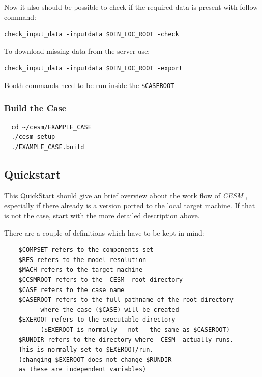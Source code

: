 \documentclass[]{article}
\begin{document}
Now it also should be possible to check if the required data is present
with follow command:

\begin{verbatim}
check_input_data -inputdata $DIN_LOC_ROOT -check
\end{verbatim}

To download missing data from the server use:

\begin{verbatim}
check_input_data -inputdata $DIN_LOC_ROOT -export
\end{verbatim}

Booth commands need to be run inside the \texttt{\$CASEROOT}

\subsubsection{Build the Case}\label{build-the-case}

\begin{verbatim}
  cd ~/cesm/EXAMPLE_CASE
  ./cesm_setup
  ./EXAMPLE_CASE.build
\end{verbatim}

\newpage

\subsection{Quickstart}\label{quickstart}

This QuickStart \cite{CESMDocs} should give an brief overview about the
work flow of \emph{CESM} , especially if there already is a version
ported to the local target machine. If that is not the case, start with
the more detailed description above.

There are a couple of definitions which have to be kept in mind:

\begin{verbatim}
    $COMPSET refers to the components set
    $RES refers to the model resolution
    $MACH refers to the target machine
    $CCSMROOT refers to the _CESM_ root directory
    $CASE refers to the case name
    $CASEROOT refers to the full pathname of the root directory 
          where the case ($CASE) will be created
    $EXEROOT refers to the executable directory 
          ($EXEROOT is normally __not__ the same as $CASEROOT)
    $RUNDIR refers to the directory where _CESM_ actually runs. 
    This is normally set to $EXEROOT/run. 
    (changing $EXEROOT does not change $RUNDIR 
    as these are independent variables)
\end{verbatim}
\end{document}
